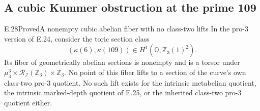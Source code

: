 \subsection{A cubic Kummer obstruction at the prime 109}

\begin{statement}{E.28}{Proved}{A nonempty cubic abelian fiber with no class-two lifts}
In the pro-$3$ version of E.24, consider the toric section class
\[
 (\kappa(6),\kappa(109))
 \in H^1(\mathbb Q,\mathbb Z_3(1)^2).
 \tag{E28.1}
\]
Its fiber of geometrically abelian sections is nonempty and is
a torsor under
$\mu_3^3\times\mathcal R_{\mathcal I}(\mathbb Z_3)\times\mathbb Z_3$.
No point of this fiber lifts to a section of the curve's own
class-two pro-$3$ quotient. No such lift exists for the intrinsic
metabelian quotient, the intrinsic marked-depth quotient of E.25,
or the inherited class-two pro-$3$ quotient either.
\end{statement}
